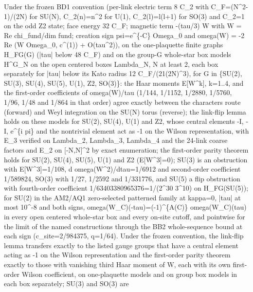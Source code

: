 \begin{gatequote}
Under the frozen BD1 convention (per-link electric term 8 C\_2 with
C\_F=(N\textasciicircum{}2-1)/(2N) for SU(N), C\_2(n)=n\textasciicircum{}2 for
U(1), C\_2(l)=l(l+1) for SO(3) and C\_2=1 on the odd Z2 state; face energy 32
C\_F; magnetic term -(tau/3) W with W = Re chi\_fund/dim fund; creation sign
psi=e\textasciicircum{}\{-C\} Omega\_0 and omega(W) = -2 Re (W Omega\_0,
c\textasciicircum{}(1)) + O(tau\textasciicircum{}2)), on the one-plaquette
finite graphs H\_FG(G) (|tau| below 48 C\_F) and on the group-G whole-star box
models H\textasciicircum{}G\_N on the open centered boxes Lambda\_N, N at
least 2, each box separately for |tau| below its Kato radius 12
C\_F/(21(2N)\textasciicircum{}3), for G in \{SU(2), SU(3), SU(4), SU(5), U(1),
Z2, SO(3)\}: the Haar moments E[W\textasciicircum{}k], k=1..4, and the
first-order coefficients of omega(W)/tau (1/144, 1/1152, 1/2880, 1/5760, 1/96,
1/48 and 1/864 in that order) agree exactly between the characters route
(forward) and Weyl integration on the SU(N) torus (reverse); the link-flip
lemma holds on these models for SU(2), SU(4), U(1) and Z2, whose central
elements -I, -I, e\textasciicircum{}\{i pi\} and the nontrivial element act as
-1 on the Wilson representation, with E\_3 verified on Lambda\_2, Lambda\_3,
Lambda\_4 and the 24-link coarse factors and E\_2 on [-N,N]\textasciicircum{}2
by exact enumeration; the first-order parity theorem holds for SU(2), SU(4),
SU(5), U(1) and Z2 (E[W\textasciicircum{}3]=0); SU(3) is an obstruction with
E[W\textasciicircum{}3]=1/108, d omega(W\textasciicircum{}2)/dtau=1/6912 and
second-order coefficient 1/589824, SO(3) with 1/27, 1/2592 and 1/331776, and
SU(5) a flip obstruction with fourth-order coefficient
1/63403380965376=1/(2\textasciicircum{}30 3\textasciicircum{}10) on
H\_FG(SU(5)); for SU(2) in the AM2/AQ1 zero-selected patterned family at
kappa=0, |tau| at most 10\textasciicircum{}-8 and both signs,
omega(W\_C)(-tau)=(-1)\textasciicircum{}\{A(C)\} omega(W\_C)(tau) in every
open centered whole-star box and every on-site cutoff, and pointwise for the
limit of the named constructions through the BB2 whole-sequence bound at each
sign (c\textquotesingle{}\_site=2/984375, q=1/64). Under the frozen
convention, the link-flip lemma transfers exactly to the listed gauge groups
that have a central element acting as -1 on the Wilson representation and the
first-order parity theorem exactly to those with vanishing third Haar moment
of W, each with its own first-order Wilson coefficient, on one-plaquette
models and on group box models in each box separately; SU(3) and SO(3) are

\end{gatequote}
